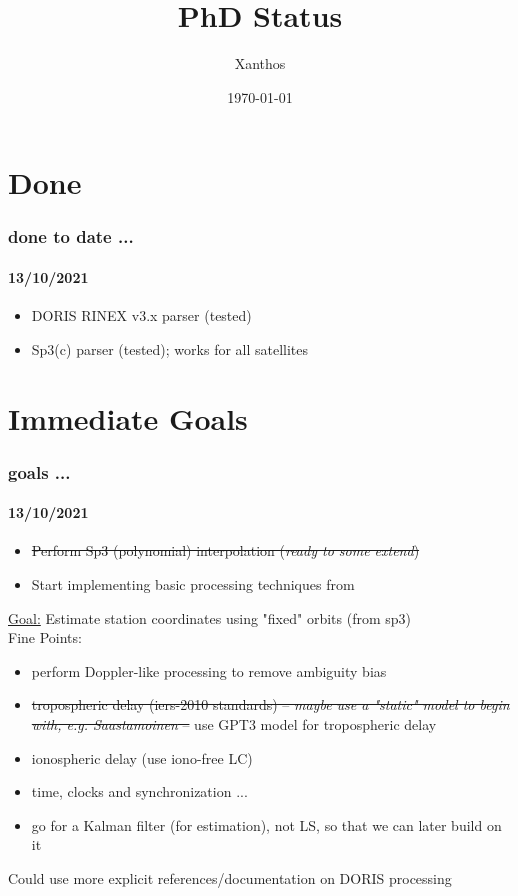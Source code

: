 \documentclass{beamer}
\title[]{PhD Status}
\author{Xanthos}
\institute{DSO \& IGN}
\date{\today}
\begin{document}
\begin{frame}
  \titlepage
\end{frame}


\section{Done}

\begin{frame}\frametitle{done to date ...}\framesubtitle{13/10/2021}

\begin{itemize}
    \item DORIS RINEX v3.x parser (tested)
    \item Sp3(c) parser (tested); works for all satellites
\end{itemize}

\end{frame}

\section{Immediate Goals}

\begin{frame}\frametitle{goals ...}\framesubtitle{13/10/2021}

\begin{itemize}
    \item \st{Perform Sp3 (polynomial) interpolation (\textit{ready to some extend})}
    \item Start implementing basic processing techniques from \cite{lemoine-2016}
\end{itemize}

\vspace{0.3cm}

\underline{Goal:} Estimate station coordinates using "fixed" orbits (from sp3)\\

Fine Points:
\begin{itemize}
    \item perform Doppler-like processing to remove ambiguity bias
    \item \st{tropospheric delay (iers-2010 standards) -- \textit{maybe use a "static" model to begin with, e.g. Saastamoinen} --} 
      use GPT3 model for tropospheric delay
    \item ionospheric delay (use iono-free LC)
    \item time, clocks and synchronization ...
    \item go for a Kalman filter (for estimation), not LS, so that we can later build on it
\end{itemize}

Could use more explicit references/documentation on DORIS processing

\end{frame}
\end{document}
